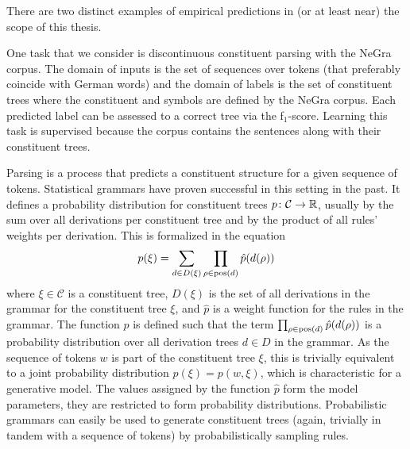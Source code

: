 \documentclass[../document.tex]{subfiles}
\begin{document}
    There are two distinct examples of empirical predictions in (or at least near) the scope of this thesis.

    \begin{example}
        One task that we consider is discontinuous constituent parsing with the NeGra corpus.
        The domain of inputs is the set of sequences over tokens (that preferably coincide with German words) and the domain of labels is the set of constituent trees where the constituent and  symbols are defined by the NeGra corpus.
        Each predicted label can be assessed to a correct tree via the f$_1$-score.
        Learning this task is supervised because the corpus contains the sentences along with their constituent trees.

        Parsing is a process that predicts a constituent structure for a given sequence of tokens.
        Statistical grammars have proven successful in this setting in the past.\cite{}
        It defines a probability distribution for constituent trees \(p\colon \mathcal{C} \to \mathbb{R}\), usually by the sum over all derivations per constituent tree and by the product of all rules' weights per derivation.
        This is formalized in the equation \[
        p(\xi) = \sum_{d \in D(\xi)} \prod_{\rho \in \operatorname{pos}(d)} \hat{p}(d(\rho))
        \]
        where \(\xi \in \mathcal{C}\) is a constituent tree, \(D(\xi)\) is the set of all derivations in the grammar for the constituent tree \(\xi\), and \(\hat{p}\) is a weight function for the rules in the grammar.
        The function \(\hat{p}\) is defined such that the term \(\prod_{\rho \in \operatorname{pos}(d)} \hat{p}(d(\rho))\) is a probability distribution over all derivation trees \(d \in D\) in the grammar.
        As the sequence of tokens \(w\) is part of the constituent tree \(\xi\), this is trivially equivalent to a joint probability distribution \(p(\xi) = p(w, \xi)\), which is characteristic for a generative model.
        The values assigned by the function \(\hat{p}\) form the model parameters, they are restricted to form probability distributions.
        Probabilistic grammars can easily be used to generate constituent trees (again, trivially in tandem with a sequence of tokens) by probabilistically sampling rules.
    \end{example}
\end{document}
